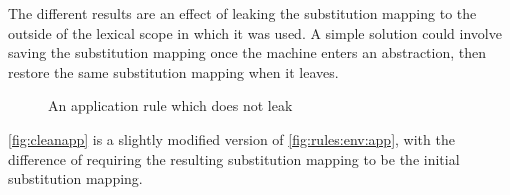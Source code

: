 \documentclass[11pt,oneside,a4paper]{report}
\begin{document}
The different results are an effect of leaking the substitution mapping to the outside of the lexical scope in which it was used.
A simple solution could involve saving the substitution mapping once the machine enters an abstraction, then restore the same substitution mapping when it leaves.
\begin{figure}[ht]
    \begin{mdframed}[style=style1]
        \vspace*{0.4cm}
          \begin{prooftree}
          \end{prooftree}   
    \end{mdframed}
    \caption{An application rule which does not leak}
    \label{fig:cleanapp}
\end{figure}
\noindent \autoref{fig:cleanapp} is a slightly modified version of \autoref{fig:rules:env:app}, with the difference of requiring the resulting substitution mapping to be the initial substitution mapping.
\end{document}
